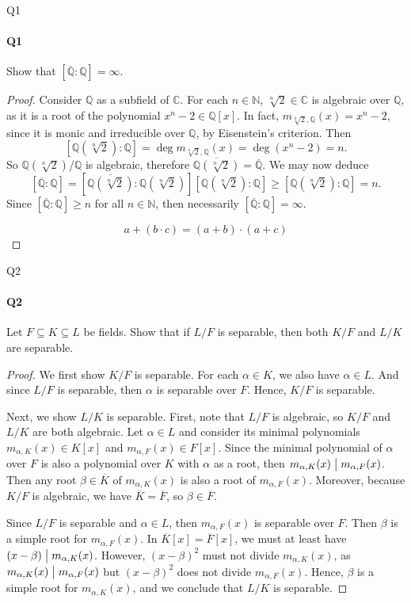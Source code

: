 \documentclass[12pt]{article}
\newenvironment{fullbox}{\begin{lrbox}{\savefullbox}\begin{minipage}{\dimexpr\textwidth-2\fboxsep\relax}}{\end{minipage}\end{lrbox}\begin{center}\framebox[\textwidth]{\usebox{\savefullbox}}\end{center}}
\newenvironment{pbox}[1][]{\begin{fullbox}\ifx#1\empty\else\paragraph{#1}\fi}{\end{fullbox}}
\theoremstyle{definition}
\newcommand{\N}{\mathbb{N}}
\newcommand{\Q}{\mathbb{Q}}
\newcommand{\C}{\mathbb{C}}
\newcommand{\clo}{\overline}
\newcommand{\divides}{\bigm|}
\begin{document}
\thispagestyle{title}


\begin{pbox}[Q1]
    Show that $[\clo{\Q} : \Q] = \infty$.
\end{pbox}

\begin{proof}
    Consider $\Q$ as a subfield of $\C$. For each $n \in \N$, $\sqrt[n]{2} \in \C$ is algebraic over $\Q$, as it is a root of the polynomial $x^n - 2 \in \Q[x]$. In fact, $m_{\sqrt[n]{2}, \Q}(x) = x^n - 2$, since it is monic and irreducible over $\Q$, by Eisenstein's criterion. Then
    \[
        [\Q(\sqrt[n]{2}) : \Q] = \deg m_{\sqrt[n]{2}, \Q}(x) = \deg(x^n - 2) = n.
    \]
    So $\Q(\sqrt[n]{2})/\Q$ is algebraic, therefore $\clo{\Q(\sqrt[n]{2})} = \clo{\Q}$. We may now deduce
    \[
        [\clo{\Q} : \Q] 
            = [\clo{\Q(\sqrt[n]{2})} : \Q(\sqrt[n]{2})][\Q(\sqrt[n]{2}) : \Q]
            \geq [\Q(\sqrt[n]{2}) : \Q]
            = n.
    \]
    Since $[\clo{\Q} : \Q] \geq n$ for all $n \in \N$, then necessarily $[\clo{\Q} : \Q] = \infty$.

    \[
        a + (b \cdot c) = (a + b) \cdot (a + c)
    \]

\end{proof}

\begin{pbox}[Q2]
    Let $F \subseteq K \subseteq L$ be fields. Show that if $L/F$ is separable, then both $K/F$ and $L/K$ are separable.
\end{pbox}

\begin{proof}
    We first show $K/F$ is separable. For each $\alpha \in K$, we also have $\alpha \in L$. And since $L/F$ is separable, then $\alpha$ is separable over $F$. Hence, $K/F$ is separable.

    Next, we show $L/K$ is separable. First, note that $L/F$ is algebraic, so $K/F$ and $L/K$ are both algebraic. Let $\alpha \in L$ and consider its minimal polynomials $m_{\alpha, K}(x) \in K[x]$ and $m_{\alpha, F}(x) \in F[x]$. Since the minimal polynomial of $\alpha$ over $F$ is also a polynomial over $K$ with $\alpha$ as a root, then $m_{\alpha, K}(x) \divides m_{\alpha, F}(x)$. Then any root $\beta \in \clo{K}$ of $m_{\alpha, K}(x)$ is also a root of $m_{\alpha, F}(x)$. Moreover, because $K/F$ is algebraic, we have $\clo{K} = \clo{F}$, so $\beta \in \clo{F}$.
    
    Since $L/F$ is separable and $\alpha \in L$, then $m_{\alpha, F}(x)$ is separable over $F$. Then $\beta$ is a simple root for $m_{\alpha, F}(x)$. In $\clo{K}[x] = \clo{F}[x]$, we must at least have $(x - \beta) \divides m_{\alpha, K}(x)$. However, $(x - \beta)^2$ must not divide $m_{\alpha, K}(x)$, as $m_{\alpha, K}(x) \divides m_{\alpha, F}(x)$ but $(x - \beta)^2$ does not divide $m_{\alpha, F}(x)$. Hence, $\beta$ is a simple root for $m_{\alpha, K}(x)$, and we conclude that $L/K$ is separable.

\end{proof}
\end{document}
